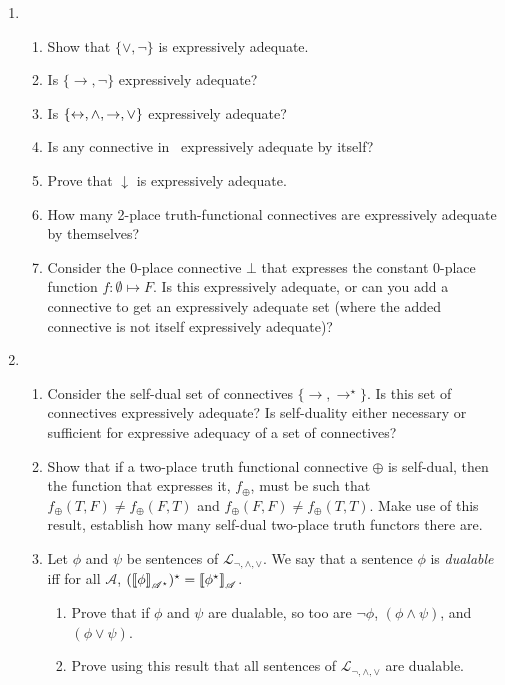 {\begin{enumerate}
\item \begin{enumerate}

	\item Show that $\{\vee,\neg\}$ is expressively adequate.
	\item Is $\{\to,\neg\}$ expressively adequate?
	\item Is $\{\leftrightarrow,\wedge,\to,\vee\}$ expressively adequate?
	\item Is any connective in \lone\ expressively adequate by itself?
	\item Prove that $\downarrow$ is expressively adequate.
	\item How many 2-place truth-functional connectives are expressively adequate by themselves?
	\item Consider the 0-place connective $\bot$ that expresses the constant 0-place function $f: \emptyset \mapsto F$. Is this expressively adequate, or can you add a connective to get an expressively adequate set (where the added connective is not itself expressively adequate)? 
\end{enumerate}

\item \begin{enumerate}
	\item Consider the self-dual set of connectives $\{\to,\to^{\star}\}$. Is this set of connectives expressively adequate? Is self-duality either necessary or sufficient for expressive adequacy of a set of connectives?  
\item Show that if a two-place truth functional connective $\oplus$ is self-dual,
	then the function that expresses it, $f_{\oplus}$, must be such that
	$f_{\oplus}(T, F) \neq  f_{\oplus}(F,T)$ and
	$f_{\oplus}(F,F) \neq f_{\oplus}(T,T)$. Make use of this
	result, establish how many self-dual two-place truth functors there
	are.
	\item Let $\phi$ and $\psi$ be sentences of $\mathcal{L}_{\neg,\wedge,\vee}$. We say that a sentence $\phi$ is \emph{dualable} iff for all $\mathscr{A}$, $(\left\llbracket \phi\right\rrbracket_{\mathscr{A^{\star}}})^{\star}=\left\llbracket \phi^{\star}\right\rrbracket_{\mathscr{A}}$. \begin{enumerate}
		\item Prove that if $\phi$ and $\psi$ are dualable, so too are $\neg\phi$, $(\phi\wedge\psi)$, and $(\phi\vee\psi)$.
		\item Prove using this result that all sentences of $\mathcal{L}_{\neg,\wedge,\vee}$ are dualable.
	\end{enumerate}
\end{enumerate}


\end{enumerate}}
